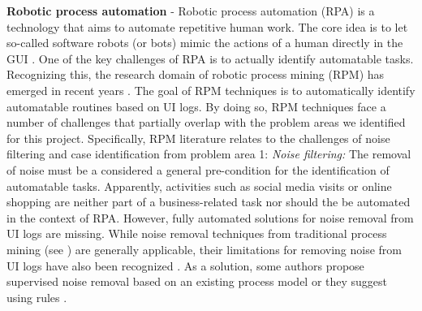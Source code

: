 
\textbf{Robotic process automation} - Robotic process automation (RPA) is a technology that aims to automate repetitive human work. The core idea is to let so-called software robots (or bots) mimic the actions of a human directly in the GUI \cite{SYED2020103162}. One of the key challenges of RPA is to actually identify automatable tasks.  Recognizing this, the research domain of robotic process mining (RPM) has emerged in recent years \cite{leno2021robotic}. The goal of RPM techniques is to automatically identify automatable routines based on UI logs. By doing so, RPM techniques face a number of challenges that partially overlap with the problem areas we identified for this project. Specifically, RPM literature relates to the challenges of noise filtering and case identification from problem area 1:   
\vspace{0.2em}
\newline%
\noindent \textit{Noise filtering:} The removal of noise  must be a considered a general pre-condition for the identification of automatable tasks. Apparently, activities such as social media visits or online shopping are neither part of a business-related task nor should the be automated in the context of RPA. However, fully automated solutions for noise removal from UI logs are missing. While noise removal techniques from traditional process mining (see \cite{tax2017discovering,CHENG2015138}) are generally applicable, their limitations for removing noise from UI logs have also been recognized \cite{leno2021robotic}. As a solution, some authors propose supervised noise removal based on an existing process model \cite{agostinelli202111} or they suggest using rules \cite{bosco2019discovering,leno2020identifying}. 
\vspace{0.2em}
\newline%
